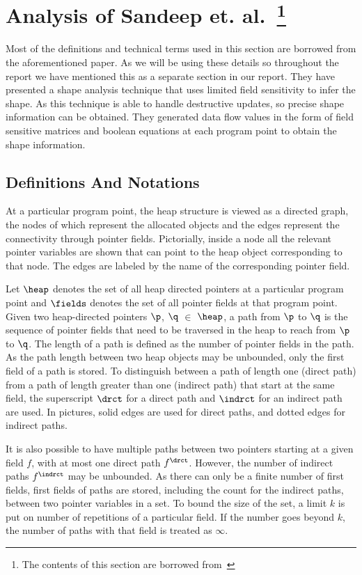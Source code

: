\section[Precise Shape Analysis using Field Sensitivity]{Analysis of Sandeep et. al.~\cite{Sandeep11thesis}\footnote{The contents of this section are borrowed from~\cite{Sandeep11thesis}}}
Most of the definitions and technical terms used in this section are borrowed from the aforementioned paper.
As we will be using these details so throughout the report we have mentioned this as a separate section in our report.
They have presented a shape analysis technique that uses limited field sensitivity to infer the shape. 
As this technique is able to handle destructive updates, so precise shape information can be obtained.
They generated data flow values in the form of field sensitive matrices and boolean equations at each program point to obtain the shape information.

\subsection{Definitions And Notations}
At a particular program point, the heap structure is viewed as a directed
graph, the nodes of which represent the allocated objects and
the edges represent the connectivity through pointer fields.
Pictorially, inside a node all the relevant pointer
variables are shown that can point to the heap object corresponding to
that node. The edges are labeled by the name of the
corresponding pointer field. 

Let $\heap$ denotes the set of all heap directed
pointers at a particular program point and $\fields$
denotes the set of all pointer fields at that program point.
Given two heap-directed pointers $\p$, $\q$ $\in$
$\heap$, a path from $\p$ to $\q$ is the sequence
of pointer fields that need to be traversed in the heap to
reach from $\p$ to $\q$.  The length of a path is
defined as the number of pointer fields in the path.  As the
path length between two heap objects may be unbounded, only the first field of a path is stored. 
To distinguish between a path of length one
(direct path) from a path of length greater than one
(indirect path) that start at the same field, the
superscript $\drct$ for a direct path and $\indrct$ for an
indirect path are used. In pictures, solid edges are used for direct
paths, and dotted edges for indirect paths.

It is also possible to have multiple paths between two
pointers starting at a given field $f$, with at most one
direct path $f^\drct$. However, the number of indirect paths
$f^\indrct$ may be unbounded. As there can only be a finite
number of first fields, first fields of paths are stored,
including the count for the indirect paths, between two
pointer variables in a set. To bound the size of the set, a limit $k$ is put 
on number of repetitions of a particular field. If the number goes beyond $k$, the number of
paths with that field is treated as $\infty$. 

